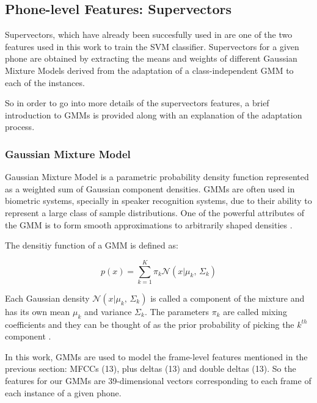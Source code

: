 \subsection{Phone-level Features: Supervectors}

Supervectors, which have already been succesfully used in
\cite{supervectors, main} are one of the two features used in this work to train the SVM
classifier. Supervectors for a given phone are obtained by extracting the means and weights
of different
Gaussian Mixture Models derived from the adaptation of a class-independent GMM
to each of the instances.

So in order to go into more details of the supervectors features, a brief introduction to
GMMs is provided along with an explanation of the adaptation process.

\subsubsection{Gaussian Mixture Model} \label{subsection:gmm}

Gaussian Mixture Model is a parametric probability density function represented as a weighted
sum of Gaussian component densities. GMMs are often used in biometric systems, specially
in speaker recognition systems, due to their ability to represent a large class of sample
distributions. One of the powerful attributes of the GMM is to form smooth approximations to
arbitrarily shaped densities \cite{gmm_reynolds}.

The densitiy function of a GMM is defined as:

\begin{equation}
  p(x) = \sum_{k=1}^{K}\pi_{k} \mathcal{N}(x|\mu_{k},\,\Sigma_{k})
\end{equation}

Each Gaussian density $\mathcal{N}(x|\mu_{k},\,\Sigma_{k})$ is called a component of the mixture
and has its own mean $\mu_{k}$ and variance $\Sigma_{k}$. The parameters $\pi_{k}$ are called
mixing coefficients and they can be thought of as the prior probability of picking the $k^{th}$
component \cite{gmm_bishop}.

In this work, GMMs are used to model the frame-level features mentioned in the previous section:
MFCCs (13), plus deltas (13) and double deltas (13). So the features for our GMMs are
39-dimensional vectors corresponding to each frame of each instance of a given phone.


